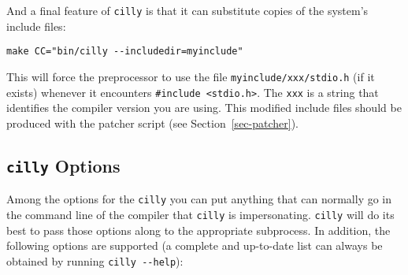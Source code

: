 \documentclass{article}
\def\secref#1{Section~\ref{sec-#1}}
\def\t#1{{\tt #1}}
\begin{document}
 And a final feature of \t{cilly} is that it can substitute copies of the
system's include files:

\begin{verbatim}
make CC="bin/cilly --includedir=myinclude"
\end{verbatim}

 This will force the preprocessor to use the file \t{myinclude/xxx/stdio.h}
(if it exists) whenever it encounters \t{\#include <stdio.h>}. The \t{xxx} is
a string that identifies the compiler version you are using. This modified
include files should be produced with the patcher script (see
\secref{patcher}).

  \subsection{\t{cilly} Options}

 Among the options for the \t{cilly} you can put anything that can normally
go in the command line of the compiler that \t{cilly} is impersonating.
\t{cilly} will do its best to pass those options along to the appropriate
subprocess. In addition, the following options are supported (a complete and
up-to-date list can always be obtained by running \t{cilly -{}-help}):
\end{document}
